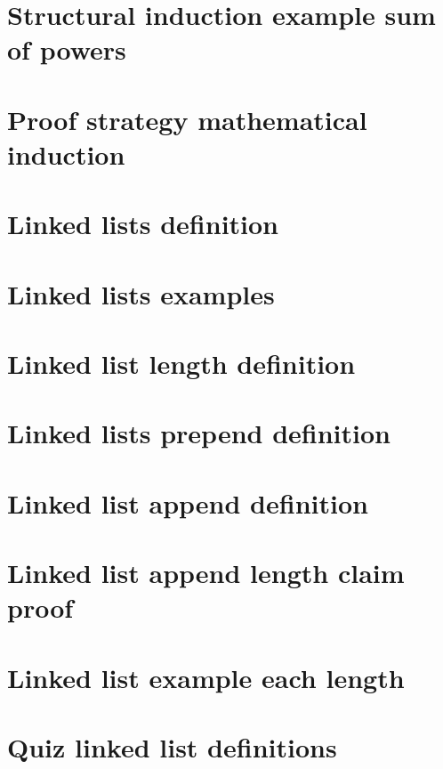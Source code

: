 \section*{Structural induction example sum of powers}

\vfill
\section*{Proof strategy mathematical induction}

\vfill
\section*{Linked lists definition}

\vfill
\section*{Linked lists examples}

\vfill
\section*{Linked list length definition}

\vfill
\section*{Linked lists prepend definition}

\vfill
\section*{Linked list append definition}

\vfill
\section*{Linked list append length claim proof}

\vfill
\section*{Linked list example each length}

\vfill
\section*{Quiz linked list definitions}

\vfill
